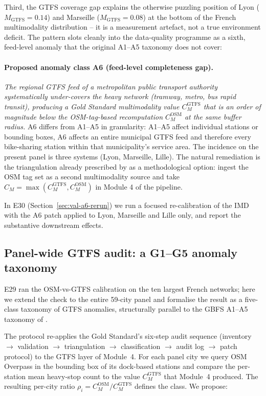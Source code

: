 \documentclass[11pt,a4paper]{article}
\begin{document}
Third, the GTFS coverage gap explains the otherwise puzzling
position of Lyon ($M_{\text{GTFS}} = 0.14$) and Marseille
($M_{\text{GTFS}} = 0.08$) at the bottom of the French
multimodality distribution -- it is a measurement artefact, not
a true environment deficit. The pattern slots cleanly into the
\citet{Fosse2026gold} data-quality programme as a sixth,
feed-level anomaly that the original A1--A5 taxonomy does not
cover:

\paragraph{Proposed anomaly class A6 (feed-level completeness
gap).} \emph{The regional GTFS feed of a metropolitan public
transport authority systematically under-covers the heavy network
(tramway, metro, bus rapid transit), producing a Gold Standard
multimodality value $C_M^{\text{GTFS}}$ that is an order of
magnitude below the OSM-tag-based recomputation
$C_M^{\text{OSM}}$ at the same buffer radius.} A6 differs from
A1--A5 in granularity: A1--A5 affect individual stations or
bounding boxes, A6 affects an entire municipal GTFS feed and
therefore every bike-sharing station within that municipality's
service area. The incidence on the present panel is three
systems (Lyon, Marseille, Lille). The natural remediation is the
triangulation already prescribed by \citet{Fosse2026gold} as a
methodological option: ingest the OSM tag set as a second
multimodality source and take $C_M = \max(C_M^{\text{GTFS}},
C_M^{\text{OSM}})$ in Module 4 of the pipeline.

In E30 (Section~\ref{sec:val-a6-rerun}) we run a focused
re-calibration of the IMD with the A6 patch applied to Lyon,
Marseille and Lille only, and report the substantive downstream
effects.


\subsection{Panel-wide GTFS audit: a G1--G5 anomaly taxonomy}
\label{sec:val-gtfs-audit}

E29 ran the OSM-vs-GTFS calibration on the ten largest French
networks; here we extend the check to the entire 59-city panel
and formalise the result as a five-class taxonomy of GTFS
anomalies, structurally parallel to the GBFS A1--A5 taxonomy of
\citet{Fosse2026gold}.

The protocol re-applies the Gold Standard's six-step audit
sequence (inventory $\to$ validation $\to$ triangulation $\to$
classification $\to$ audit log $\to$ patch protocol) to the
GTFS layer of Module~4. For each panel city we query OSM
Overpass in the bounding box of its dock-based stations and
compare the per-station mean heavy-stop count to the value
$C_M^{\text{GTFS}}$ that Module~4 produced. The resulting
per-city ratio $\rho_i = C_M^{\text{OSM}} / C_M^{\text{GTFS}}$
defines the class. We propose:
\end{document}
